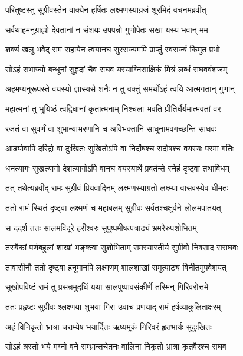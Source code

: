 
\twolineshloka
{परितुष्टस्तु सुग्रीवस्तेन वाक्येन हर्षितः}
{लक्ष्मणस्याग्रजं शूरमिदं वचनमब्रवीत्} %

\twolineshloka
{सर्वथाहमनुग्राह्यो देवतानां न संशयः}
{उपपन्नो गुणोपेतः सखा यस्य भवान् मम} %

\twolineshloka
{शक्यं खलु भवेद् राम सहायेन त्वयानघ}
{सुरराज्यमपि प्राप्तुं स्वराज्यं किमुत प्रभो} %

\twolineshloka
{सोऽहं सभाज्यो बन्धूनां सुहृदां चैव राघव}
{यस्याग्निसाक्षिकं मित्रं लब्धं राघववंशजम्} %

\twolineshloka
{अहमप्यनुरूपस्ते वयस्यो ज्ञास्यसे शनैः}
{न तु वक्तुं समर्थोऽहं त्वयि आत्मगतान् गुणान्} %

\twolineshloka
{महात्मनां तु भूयिष्ठं त्वद्विधानां कृतात्मनाम्}
{निश्चला भवति प्रीतिर्धैर्यमात्मवतां वर} %

\twolineshloka
{रजतं वा सुवर्णं वा शुभान्याभरणानि च}
{अविभक्तानि साधूनामवगच्छन्ति साधवः} %

\twolineshloka
{आढ्योवापि दरिद्रो वा दुःखितः सुखितोऽपि वा}
{निर्दोषश्च सदोषश्च वयस्यः परमा गतिः} %

\twolineshloka
{धनत्यागः सुखत्यागो देशत्यागोऽपि वानघ}
{वयस्यार्थे प्रवर्तन्ते स्नेहं दृष्ट्वा तथाविधम्} %

\twolineshloka
{तत् तथेत्यब्रवीद् रामः सुग्रीवं प्रियवादिनम्}
{लक्ष्मणस्याग्रतो लक्ष्म्या वासवस्येव धीमतः} %

\twolineshloka
{ततो रामं स्थितं दृष्ट्वा लक्ष्मणं च महाबलम्}
{सुग्रीवः सर्वतश्चक्षुर्वने लोलमपातयत्} %

\twolineshloka
{स ददर्श ततः सालमविदूरे हरीश्वरः}
{सुपुष्पमीषत्पत्राढ्यं भ्रमरैरुपशोभितम्} %

\twolineshloka
{तस्यैकां पर्णबहुलां शाखां भङ्क्त्वा सुशोभिताम्}
{रामस्यास्तीर्य सुग्रीवो निषसाद सराघवः} %

\twolineshloka
{तावासीनौ ततो दृष्ट्वा हनूमानपि लक्ष्मणम्}
{शालशाखां समुत्पाट्य विनीतमुपवेशयत्} %

\twolineshloka
{सुखोपविष्टं रामं तु प्रसन्नमुदधिं यथा}
{सालपुष्पावसंकीर्णे तस्मिन् गिरिवरोत्तमे} %

\twolineshloka
{ततः प्रहृष्टः सुग्रीवः श्लक्ष्णया शुभया गिरा}
{उवाच प्रणयाद् रामं हर्षव्याकुलिताक्षरम्} %

\twolineshloka
{अहं विनिकृतो भ्रात्रा चराम्येष भयार्दितः}
{ऋष्यमूकं गिरिवरं हृतभार्यः सुदुःखितः} %

\twolineshloka
{सोऽहं त्रस्तो भये मग्नो वने सम्भ्रान्तचेतनः}
{वालिना निकृतो भ्रात्रा कृतवैरश्च राघव} %

